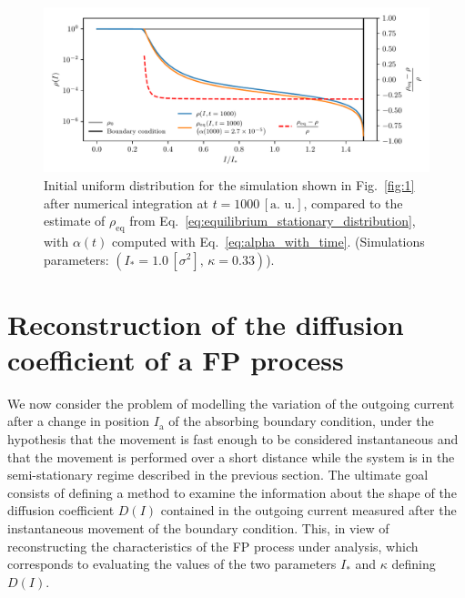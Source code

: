 \begin{figure}[t]
    \centering
    \includegraphics[width=\textwidth]{4_probing_the_diffusive_behavior/figs/final/new_stationary_distribution_s.pdf}
    \caption{Initial uniform distribution for the simulation shown in Fig.~\ref{fig:1} after numerical integration at $t=1000 \, [\text{a. u.}]$, compared to the estimate of $\rho_\mathrm{eq}$ from Eq.~\eqref{eq:equilibrium_stationary_distribution}, with $\alpha(t)$ computed with Eq.~\eqref{eq:alpha_with_time}. (Simulations parameters: $(I_\ast = 1.0\,[\sigma^2],\, \kappa = 0.33)$).}
    \label{fig:3}
\end{figure}


\section{Reconstruction of the diffusion coefficient of a FP process}
\label{sec:moving_the_absorbing_barrier}


We now consider the problem of modelling the variation of the outgoing current after a change in position $I_\mathrm{a}$ of the absorbing boundary condition, under the hypothesis that the movement is fast enough to be considered instantaneous and that the movement is performed over a short distance while the system is in the semi-stationary regime described in the previous section. The ultimate goal consists of defining a method to examine the information about the shape of the diffusion coefficient $D(I)$ contained in the outgoing current measured after the instantaneous movement of the boundary condition. This, in view of reconstructing the characteristics of the FP process under analysis, which corresponds to evaluating the values of the two parameters $I_\ast$ and $\kappa$ defining $D(I)$.

